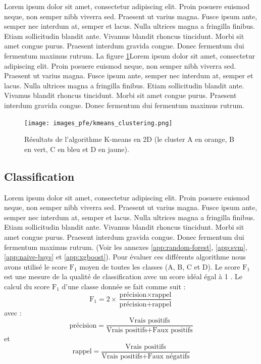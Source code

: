 Lorem ipsum dolor sit amet, consectetur adipiscing elit. Proin posuere euismod neque, non semper nibh viverra sed. Praesent ut varius magna. Fusce ipsum ante, semper nec interdum at, semper et lacus. Nulla ultrices magna a fringilla finibus. Etiam sollicitudin blandit ante. Vivamus blandit rhoncus tincidunt. Morbi sit amet congue purus. Praesent interdum gravida congue. Donec fermentum dui fermentum maximus rutrum. La figure \ref{fig:kmeans-pca}Lorem ipsum dolor sit amet, consectetur adipiscing elit. Proin posuere euismod neque, non semper nibh viverra sed. Praesent ut varius magna. Fusce ipsum ante, semper nec interdum at, semper et lacus. Nulla ultrices magna a fringilla finibus. Etiam sollicitudin blandit ante. Vivamus blandit rhoncus tincidunt. Morbi sit amet congue purus. Praesent interdum gravida congue. Donec fermentum dui fermentum maximus rutrum.

\begin{figure}[hbt!]
  \centering
  \texttt{[image: images\_pfe/kmeans\_clustering.png]}
  \caption{Résultats de l'algorithme K-means en 2D (le cluster A en orange, B en vert, C en bleu et D en jaune).}
  \label{fig:kmeans-pca}
\end{figure}
\FloatBarrier

\subsection{Classification}
Lorem ipsum dolor sit amet, consectetur adipiscing elit. Proin posuere euismod neque, non semper nibh viverra sed. Praesent ut varius magna. Fusce ipsum ante, semper nec interdum at, semper et lacus. Nulla ultrices magna a fringilla finibus. Etiam sollicitudin blandit ante. Vivamus blandit rhoncus tincidunt. Morbi sit amet congue purus. Praesent interdum gravida congue. Donec fermentum dui fermentum maximus rutrum. (Voir les annexes \ref{app:random-forest}, \ref{app:svm}, \ref{app:naive-bays} et \ref{app:xgboost}). Pour évaluer ces différents algorithme nous avons utilisé le score $\text{F}_1$ moyen de toutes les classes (A, B, C et D). Le score $\text{F}_1$ est une mesure de la qualité de classification avec un score idéal égal à 1 . Le calcul du score $\text{F}_1$ d'une classe donnée se fait comme suit :
\begin{equation*}
    \text{F}_1 = 2 × \frac{\text{précision} ×  \text{rappel}}{\text{précision}+\text{rappel}}
\end{equation*}
avec :
\begin{equation*}
    \text{précision} = \frac{\text{Vrais positifs}}{\text{Vrais positifs}+\text{Faux positifs}}
\end{equation*}
et 
\begin{equation*}
    \text{rappel} = \frac{\text{Vrais positifs}}{\text{Vrais positifs}+\text{Faux négatifs}}
\end{equation*}

